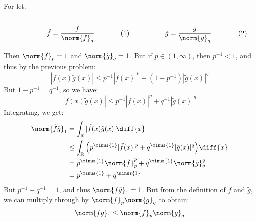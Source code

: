\documentclass[crop=false,class=article,oneside]{standalone}
\begin{document}
    \begin{solution}
        For let:
        \par
        \begin{subequations}
            \begin{minipage}[b]{0.49\textwidth}
                \centering
                \begin{equation}
                    \tilde{f}=\frac{f}{\norm{f}_{q}}
                \end{equation}
            \end{minipage}
            \hfill
            \begin{minipage}[b]{0.49\textwidth}
                \centering
                \begin{equation}
                    \tilde{g}=\frac{g}{\norm{g}_{q}}
                \end{equation}
            \end{minipage}
        \end{subequations}
        \par\hfill\par
        Then $\norm{\tilde{f}}_{p}=1$ and $\norm{\tilde{g}}_{q}=1$.
        But if $p\in(1,\infty)$, then $p^{\minus{1}}<1$, and thus by the
        previous problem:
        \begin{equation}
            |\tilde{f}(x)\tilde{g}(x)|\leq
                p^{\minus{1}}|\tilde{f}(x)|^{p}+
                (1-p^{\minus{1}})|\tilde{g}(x)|^{q}
        \end{equation}
        But $1-p^{\minus{1}}=q^{\minus{1}}$, so we have:
        \begin{equation}
            |\tilde{f}(x)\tilde{g}(x)|\leq
                p^{\minus{1}}|\tilde{f}(x)|^{p}+
                q^{\minus{1}}|\tilde{g}(x)|^{q}
        \end{equation}
        Integrating, we get:
        \begin{subequations}
            \begin{align}
                \norm{\tilde{f}\tilde{g}}_{1}
                &=\int_{\mathbb{R}}|\tilde{f}(x)\tilde{g}(x)|\diff{x}\\
                &\leq\int_{\mathbb{R}}\Big(
                    p^{\minus{1}}|\tilde{f}(x)|^{p}+
                    q^{\minus{1}}|\tilde{g}(x)|^{q}\Big)\diff{x}\\
                &=p^{\minus{1}}\norm{\tilde{f}}_{p}^{p}+
                q^{\minus{1}}\norm{\tilde{g}}_{q}^{q}\\
                &=p^{\minus{1}}+q^{\minus{1}}
            \end{align}
        \end{subequations}
        But $p^{\minus{1}}+q^{\minus{1}}=1$, and thus
        $\norm{\tilde{f}\tilde{g}}_{1}=1$. But from the definition of
        $\tilde{f}$ and $\tilde{g}$, we can multiply through by
        $\norm{f}_{p}\norm{g}_{q}$ to obtain:
        \begin{equation}
            \norm{fg}_{1}\leq\norm{f}_{p}\norm{g}_{q}
        \end{equation}
    \end{solution}
\end{document}
